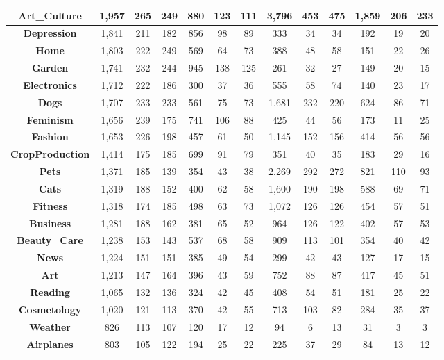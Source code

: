 \begin{table}[t]
{\begin{tabular}{|c||c|c|c||c|c|c||c|c|c||c|c|c|}
\textbf{Art\_Culture} & 1,957 & 265 & 249 & 880 & 123 & 111 & 3,796 & 453 & 475 & 1,859 & 206 & 233\\ \hline
\textbf{Depression} & 1,841 & 211 & 182 & 856 & 98 & 89 & 333 & 34 & 34 & 192 & 19 & 20\\ \hline
\textbf{Home} & 1,803 & 222 & 249 & 569 & 64 & 73 & 388 & 48 & 58 & 151 & 22 & 26\\ \hline
\textbf{Garden} & 1,741 & 232 & 244 & 945 & 138 & 125 & 261 & 32 & 27 & 149 & 20 & 15\\ \hline
\textbf{Electronics} & 1,712 & 222 & 186 & 300 & 37 & 36 & 555 & 58 & 74 & 140 & 23 & 17\\ \hline
\textbf{Dogs} & 1,707 & 233 & 233 & 561 & 75 & 73 & 1,681 & 232 & 220 & 624 & 86 & 71\\ \hline
\textbf{Feminism} & 1,656 & 239 & 175 & 741 & 106 & 88 & 425 & 44 & 56 & 173 & 11 & 25\\ \hline
\textbf{Fashion} & 1,653 & 226 & 198 & 457 & 61 & 50 & 1,145 & 152 & 156 & 414 & 56 & 56\\ \hline
\textbf{CropProduction} & 1,414 & 175 & 185 & 699 & 91 & 79 & 351 & 40 & 35 & 183 & 29 & 16\\ \hline
\textbf{Pets} & 1,371 & 185 & 139 & 354 & 43 & 38 & 2,269 & 292 & 272 & 821 & 110 & 93\\ \hline
\textbf{Cats} & 1,319 & 188 & 152 & 400 & 62 & 58 & 1,600 & 190 & 198 & 588 & 69 & 71\\ \hline
\textbf{Fitness} & 1,318 & 174 & 185 & 498 & 63 & 73 & 1,072 & 126 & 126 & 454 & 57 & 51\\ \hline
\textbf{Business} & 1,281 & 188 & 162 & 381 & 65 & 52 & 964 & 126 & 122 & 402 & 57 & 53\\ \hline
\textbf{Beauty\_Care} & 1,238 & 153 & 143 & 537 & 68 & 58 & 909 & 113 & 101 & 354 & 40 & 42\\ \hline
\textbf{News} & 1,224 & 151 & 151 & 385 & 49 & 54 & 299 & 42 & 43 & 127 & 17 & 15\\ \hline
\textbf{Art} & 1,213 & 147 & 164 & 396 & 43 & 59 & 752 & 88 & 87 & 417 & 45 & 51\\ \hline
\textbf{Reading} & 1,065 & 132 & 136 & 324 & 42 & 45 & 408 & 54 & 51 & 181 & 25 & 22\\ \hline
\textbf{Cosmetology} & 1,020 & 121 & 113 & 370 & 42 & 55 & 713 & 103 & 82 & 284 & 35 & 37\\ \hline
\textbf{Weather} & 826 & 113 & 107 & 120 & 17 & 12 & 94 & 6 & 13 & 31 & 3 & 3\\ \hline
\textbf{Airplanes} & 803 & 105 & 122 & 194 & 25 & 22 & 225 & 37 & 29 & 84 & 13 & 12\\ \hline

\end{tabular}}
\end{table}

